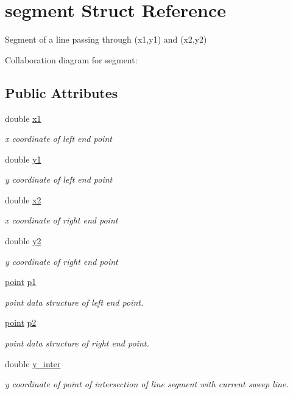 \hypertarget{structsegment}{}\section{segment Struct Reference}
\label{structsegment}


Segment of a line passing through (x1,y1) and (x2,y2)  




Collaboration diagram for segment\+:
\subsection*{Public Attributes}
\begin{DoxyCompactItemize}
\item 
double \hyperlink{structsegment_a2ddfc4d7098219fce29a99c188459b1f}{x1}
\begin{DoxyCompactList}\small\item\em x coordinate of left end point \end{DoxyCompactList}\item 
double \hyperlink{structsegment_a16356e18bb4090d65e23bbd86f12377c}{y1}
\begin{DoxyCompactList}\small\item\em y coordinate of left end point \end{DoxyCompactList}\item 
double \hyperlink{structsegment_a9157415f277d54e5883c5c9cd8b8b530}{x2}
\begin{DoxyCompactList}\small\item\em x coordinate of right end point \end{DoxyCompactList}\item 
double \hyperlink{structsegment_a5653d346ca143edd172e00a05de687b9}{y2}
\begin{DoxyCompactList}\small\item\em y coordinate of right end point \end{DoxyCompactList}\item 
\hyperlink{structpoint}{point} \hyperlink{structsegment_a352137cd1482d20b132df4d2f864e85e}{p1}
\begin{DoxyCompactList}\small\item\em point data structure of left end point. \end{DoxyCompactList}\item 
\hyperlink{structpoint}{point} \hyperlink{structsegment_a057df1ea382aaafbdf0b76d0631e4ada}{p2}
\begin{DoxyCompactList}\small\item\em point data structure of right end point. \end{DoxyCompactList}\item 
double \hyperlink{structsegment_af986053f4372a89b98199298afd6de55}{y\+\_\+inter}
\begin{DoxyCompactList}\small\item\em y coordinate of point of intersection of line segment with current sweep line. \end{DoxyCompactList}\end{DoxyCompactItemize}


